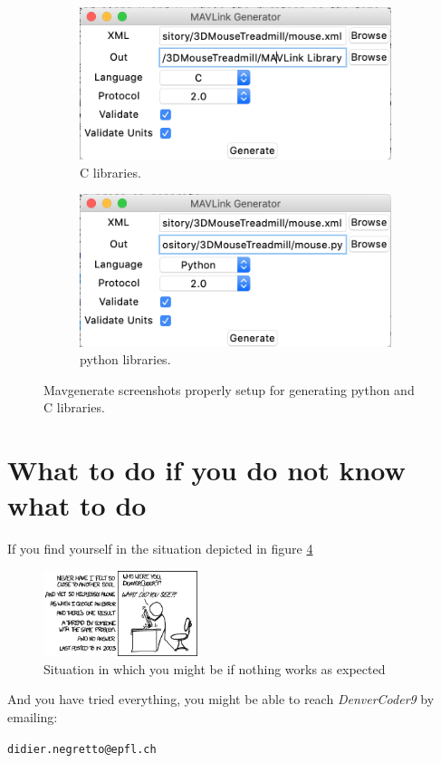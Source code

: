 \documentclass[12pt,a4paper, twoside]{article}
\begin{document}
\begin{figure}[H]
	\centering
	\begin{subfigure}[b]{0.4\textwidth}
		\includegraphics[width=\textwidth]{fig/gen_c}
		\caption{C libraries.}
		\label{fig:gen_c}
	\end{subfigure}
	\begin{subfigure}[b]{0.4\textwidth}
		\includegraphics[width=\textwidth]{fig/gen_py}
		\caption{python libraries.}
		\label{fig:gen_py}
	\end{subfigure}
	\caption[Mavgenerate screenshots]{Mavgenerate screenshots properly setup for generating python and C libraries.}
\end{figure}

\section{What to do if you do not know what to do}
If you find yourself in the situation depicted in figure \ref{fig:xkcd}
\begin{figure}[H]
	\centering
	\includegraphics[width=0.4\textwidth]{fig/wisdom_of_the_ancients}
	\caption{Situation in which you might be if nothing works as expected \cite{xkcd}}\label{fig:xkcd}
\end{figure}
And you have tried everything, you might be able to reach \textit{DenverCoder9} by emailing:\\
\vspace{-0.5cm}
\begin{center}
	\texttt{didier.negretto@epfl.ch}
\end{center}
\end{document}
